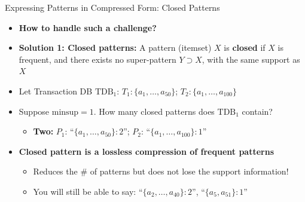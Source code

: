 \documentclass[aspectratio=169, 11pt]{beamer}
\begin{document}
\begin{frame}{Expressing Patterns in Compressed Form: Closed Patterns}
    \begin{itemize}
        \item \textbf{How to handle such a challenge?}
        \item \textbf{Solution 1: Closed patterns:} A pattern (itemset) $X$ is \textbf{closed} if $X$ is frequent, and there exists no super-pattern $Y \supset X$, with the same support as $X$
        \item Let Transaction DB $\text{TDB}_1$: $T_1: \{a_1, \dots, a_{50}\}$; \quad $T_2: \{a_1, \dots, a_{100}\}$
        \item Suppose $\text{minsup} = 1$. How many closed patterns does $\text{TDB}_1$ contain?
        \begin{itemize}
            \item \textbf{Two:} $P_1$: ``$\{a_1, \dots, a_{50}\}: 2$''; \quad $P_2$: ``$\{a_1, \dots, a_{100}\}: 1$''
        \end{itemize}
        \item \textbf{Closed pattern is a lossless compression of frequent patterns}
        \begin{itemize}
            \item Reduces the \# of patterns but does not lose the support information!
            \item You will still be able to say: ``$\{a_2, \dots, a_{40}\}: 2$'', ``$\{a_5, a_{51}\}: 1$''
        \end{itemize}
    \end{itemize}
\end{frame}
\end{document}
